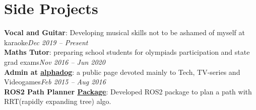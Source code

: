 \section{Side Projects}
\resumeSubHeadingListStart
      
      \resumeProjectHeading
      {\textbf{Vocal and Guitar}{: Developing musical skills not to be ashamed of myself at karaoke}}{\emph{Dec 2019 -- Present}} \\
      
      \resumeProjectHeading
      {\textbf{Maths Tutor}{: preparing school students for olympiads participation and state grad exams}}{\emph{Nov 2016 -- Jun 2020}} \\
      
      \resumeProjectHeading
      {\textbf{Admin at \href{https://vk.com/alpha_dogs}{\underline{alphadog}}}{: a public page devoted mainly to Tech, TV-series and Videogames}}{\emph{Feb 2015 -- Aug 2016}} \\
      
      \resumeProjectHeading
      {\textbf{ROS2 Path Planner \href{https://github.com/aaptss/route_planning_ros2}{\underline{Package}}}{: Developed ROS2 package to plan a path with RRT(rapidly expanding tree) algo. }}\\

\resumeSubHeadingListEnd